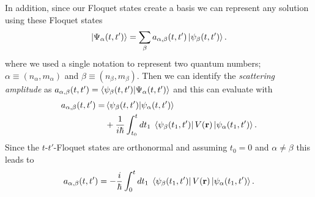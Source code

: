 In addition, since our Floquet states create a basis we can represent any solution using these Floquet states
\begin{equation} \label{eq_c12}
  \ket{\Psi_{\alpha}(t,t')} = \sum_{\beta} a_{\alpha,\beta}(t,t')
  \ket{\psi_{\beta}(t,t')}.
\end{equation}
where we used a single notation to represent two quantum numbers; $\alpha \equiv (n_{\alpha},m_{\alpha})$ and $\beta \equiv (n_{\beta},m_{\beta})$.
Then we can identify the \textit{scattering amplitude} as $a_{\alpha,\beta}(t,t') =
\braket{\psi_{\beta}(t,t')}{\Psi_{\alpha}(t,t')}$ and this can evaluate with
\begin{equation} \label{eq_c13}
  \begin{aligned}
  a_{\alpha,\beta}(t,t') = &
  \braket{\psi_{\beta}(t,t')}{\psi_{\alpha}(t,t')} \\
  &+
  \frac{1}{i\hbar}
  \int_{t_0}^t dt_1 \;
  \bra{\psi_{\beta}(t_1,t')}
  V(\vb{r}) \ket{\psi_{\alpha}(t_1,t')}.
  \end{aligned}
\end{equation}
Since the $t$-$t'$-Floquet states are orthonormal and assuming $t_0 = 0$ and $\alpha \neq \beta$ this leads to
\begin{equation} \label{eq_c14}
  a_{\alpha,\beta}(t,t') =
  -
  \frac{i}{\hbar}
  \int_{0}^t dt_1 \;
  \bra{\psi_{\beta}(t_1,t')}
  V(\vb{r}) \ket{\psi_{\alpha}(t_1,t')}.
\end{equation}


